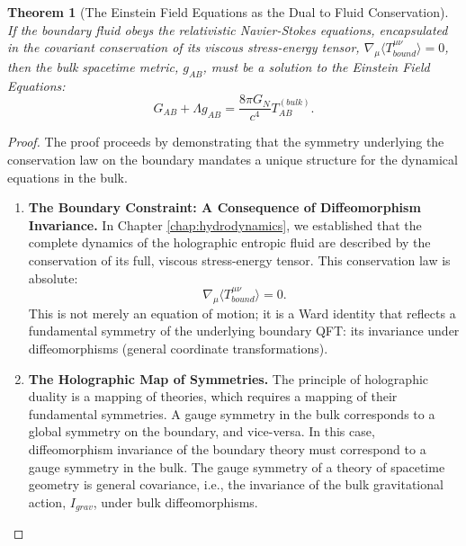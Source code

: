 \documentclass[11pt, letterpaper]{report}
\theoremstyle{plain} %
\newtheorem{theorem}{Theorem}[chapter]
\theoremstyle{definition} %
\theoremstyle{remark} %
\begin{document}
\begin{theorem}[The Einstein Field Equations as the Dual to Fluid Conservation]
\label{thm:efe_from_hydro}
If the boundary fluid obeys the relativistic Navier-Stokes equations, encapsulated in the covariant conservation of its viscous stress-energy tensor, $\nabla_\mu \langle T^{\mu\nu}_{bound} \rangle = 0$, then the bulk spacetime metric, $g_{AB}$, must be a solution to the Einstein Field Equations:
\begin{equation}
    G_{AB} + \Lambda g_{AB} = \frac{8\pi G_N}{c^4} T_{AB}^{(bulk)}.
\end{equation}
\end{theorem}
\begin{proof}
The proof proceeds by demonstrating that the symmetry underlying the conservation law on the boundary mandates a unique structure for the dynamical equations in the bulk.

\begin{enumerate}
    \item \textbf{The Boundary Constraint: A Consequence of Diffeomorphism Invariance.}
    In Chapter \ref{chap:hydrodynamics}, we established that the complete dynamics of the holographic entropic fluid are described by the conservation of its full, viscous stress-energy tensor. This conservation law is absolute:
    \begin{equation}
        \nabla_\mu \langle T^{\mu\nu}_{bound} \rangle = 0.
        \label{eq:boundary_conservation_revisited}
    \end{equation}
    This is not merely an equation of motion; it is a Ward identity that reflects a fundamental symmetry of the underlying boundary QFT: its invariance under diffeomorphisms (general coordinate transformations).

    \item \textbf{The Holographic Map of Symmetries.}
    The principle of holographic duality is a mapping of theories, which requires a mapping of their fundamental symmetries. A gauge symmetry in the bulk corresponds to a global symmetry on the boundary, and vice-versa. In this case, diffeomorphism invariance of the boundary theory must correspond to a gauge symmetry in the bulk. The gauge symmetry of a theory of spacetime geometry is general covariance, i.e., the invariance of the bulk gravitational action, $I_{grav}$, under bulk diffeomorphisms.


\end{enumerate}
\end{proof}
\end{document}

